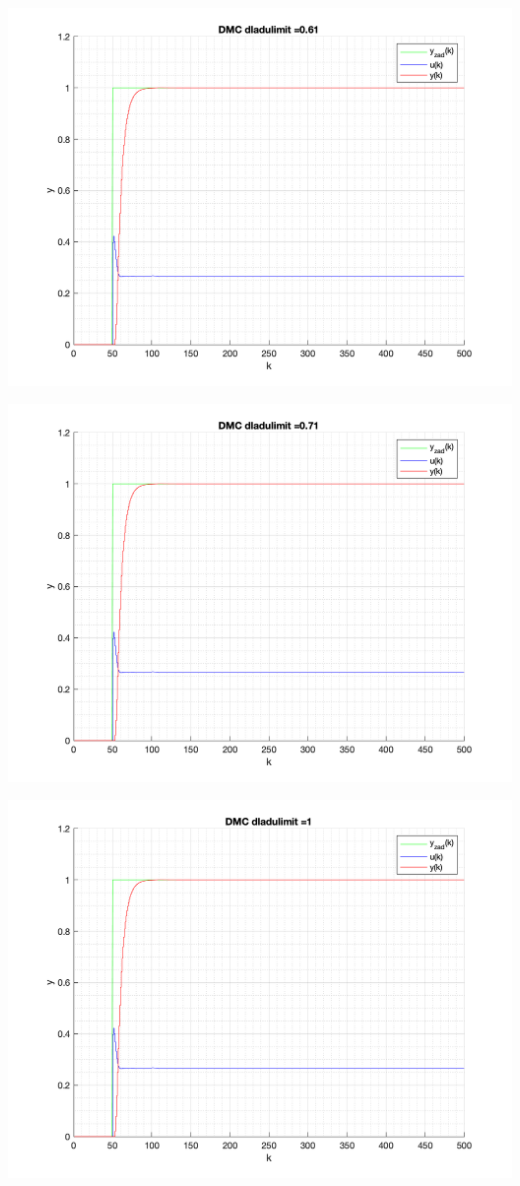 \documentclass[a4paper, 11pt]{article}
\begin{document}
\begin{enumerate}
 \includegraphics[width=\linewidth]{./ModelsP6_dulimit/P4_DMC_dulimit_0_61_png.png} 
 
 \includegraphics[width=\linewidth]{./ModelsP6_dulimit/P4_DMC_dulimit_0_71_png.png} 
 
 \includegraphics[width=\linewidth]{./ModelsP6_dulimit/P4_DMC_dulimit_1_png.png} 
 

\end{enumerate}
\end{document}
